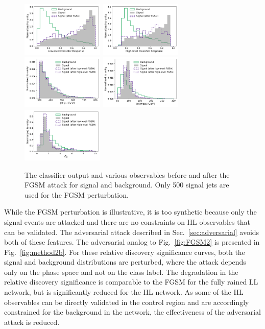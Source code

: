 \documentclass[reprint,nofootinbib,...]{revtex4-1}
\begin{document}
\begin{figure}[h!]
\centering
\includegraphics[width=0.35\textwidth]{figures/FGSM/FGSM_NN_LL.pdf}
\includegraphics[width=0.35\textwidth]{figures/FGSM/FGSM_NN_HL.pdf}
\includegraphics[width=0.35\textwidth]{figures/FGSM/FGSM_pT.pdf}
\includegraphics[width=0.35\textwidth]{figures/FGSM/FGSM_mass.pdf}
\includegraphics[width=0.35\textwidth]{figures/FGSM/FGSM_D2.pdf}
\caption{The classifier output and various observables before and after the FGSM attack for signal and background.  Only 500 signal jets are used for the FGSM perturbation.}
\label{fig:FGSM:distributions}
\end{figure}

While the FGSM perturbation is illustrative, it is too synthetic because only the signal events are attacked and there are no constraints on HL observables that can be validated.  The adversarial attack described in Sec.~\ref{sec:adversarial} avoids both of these features.  The adversarial analog to Fig.~\ref{fig:FGSM2} is presented in Fig.~\ref{fig:method2b}.   For these relative discovery significance curves, both the signal and background distributions are perturbed, where the attack depends only on the phase space and not on the class label.  The degradation in the relative discovery significance is comparable to the FGSM for the fully rained LL network, but is significantly reduced for the HL network.  As some of the HL observables can be directly validated in the control region and are accordingly constrained for the background in the network, the effectiveness of the adversarial attack is reduced.
\end{document}
